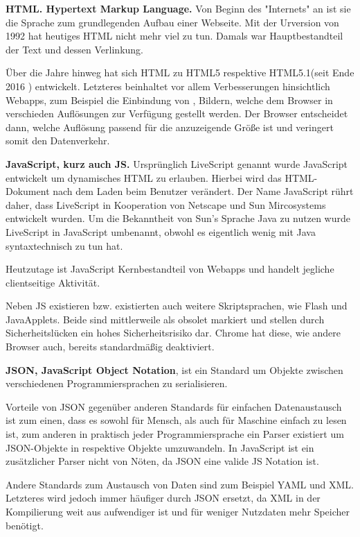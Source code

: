 \documentclass[a4paper,12pt]{scrartcl}      %
\let\oldcite\cite
\renewcommand{\cite}[1]{\textsuperscript{\oldcite{#1}}}
\newcommand{\spacer}{\par\bigskip\noindent}
\begin{document}
	\textbf{HTML. Hypertext Markup Language.} Von Beginn des "Internets" an ist sie die Sprache zum grundlegenden Aufbau einer Webseite. Mit der Urversion von 1992 hat heutiges HTML nicht mehr viel zu tun. Damals war Hauptbestandteil der Text und dessen Verlinkung.\cite{htmlWiki}\par
	Über die Jahre hinweg hat sich HTML zu HTML5 respektive HTML5.1(seit Ende 2016 \cite{html51}) entwickelt. Letzteres beinhaltet vor allem Verbesserungen hinsichtlich Webapps, zum Beispiel die Einbindung von , Bildern, welche dem Browser in verschieden Auflösungen zur Verfügung gestellt werden. Der Browser entscheidet dann, welche Auflösung passend für die anzuzeigende Größe ist und veringert somit den Datenverkehr. \cite{html51blog}  \par
	
	\spacer\textbf{JavaScript, kurz auch JS.} Ursprünglich LiveScript genannt wurde JavaScript entwickelt um dynamisches HTML zu erlauben. Hierbei wird das HTML-Dokument nach dem Laden beim Benutzer verändert. Der Name JavaScript rührt daher, dass LiveScript in Kooperation von Netscape und Sun Mircosystems entwickelt wurden. Um die Bekanntheit von Sun's Sprache Java zu nutzen wurde LiveScript in JavaScript umbenannt, obwohl es eigentlich wenig mit Java syntaxtechnisch zu tun hat. \cite{jsWiki}\par
	Heutzutage ist JavaScript Kernbestandteil von Webapps und handelt jegliche clientseitige Aktivität.\par
	Neben JS existieren bzw. existierten auch weitere Skriptsprachen, wie Flash und JavaApplets. Beide sind mittlerweile als obsolet markiert und stellen durch Sicherheitslücken ein hohes Sicherheitsrisiko dar.\cite{flashPlayer} Chrome hat diese, wie andere Browser auch, bereits standardmäßig deaktiviert.\cite{chromeNoFlash}\par
	
	\spacer\textbf{JSON, JavaScript Object Notation}, ist ein Standard um Objekte zwischen verschiedenen Programmiersprachen zu serialisieren.\par
	Vorteile von JSON gegenüber anderen Standards für einfachen Datenaustausch ist zum einen, dass es sowohl für Mensch, als auch für Maschine einfach zu lesen ist, zum anderen in praktisch jeder Programmiersprache ein Parser existiert um JSON-Objekte in respektive Objekte umzuwandeln. In JavaScript ist ein zusätzlicher Parser nicht von Nöten, da JSON eine valide JS Notation ist.\cite{json}\par
	Andere Standards zum Austausch von Daten sind zum Beispiel YAML und XML. Letzteres wird jedoch immer häufiger durch JSON ersetzt, da XML in der Kompilierung weit aus aufwendiger ist und für weniger Nutzdaten mehr Speicher benötigt.\par
	
\end{document}
